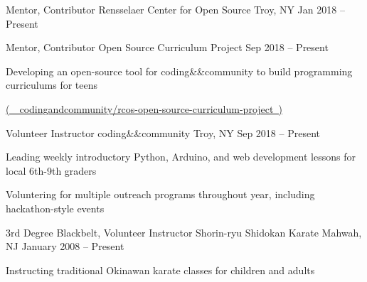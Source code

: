 


\begin{cventries}

  \cventry
  {Mentor, Contributor}
  {Rensselaer Center for Open Source}
  {Troy, NY}
  {Jan 2018 -- Present}
  {
    \vspace*{-1\abovedisplayskip}
    \begin{cvsubentries}
      \cvsubentry
      {Mentor, Contributor}
      {Open Source Curriculum Project}
      {Sep 2018 -- Present}
      {
        \begin{cvitems}
          \item Developing an open-source tool for coding\&\&community to build programming curriculums for teens
          \item[] \href{https://github.com/codingandcommunity/rcos-open-source-curriculum-project}{(\ \faGithubSquare\ codingandcommunity/rcos-open-source-curriculum-project\ )}
        \end{cvitems}
      }
    \end{cvsubentries}
    \vspace*{-1\belowdisplayskip}
  }


  \cventry
  {Volunteer Instructor}
  {coding\&\&community}
  {Troy, NY}
  {Sep 2018 -- Present}
  {
    \begin{cvitems}
      \item Leading weekly introductory Python, Arduino, and web development lessons for local 6th-9th graders
      \item Voluntering for multiple outreach programs throughout year, including hackathon-style events
    \end{cvitems}
  }


  \cventry
  {3rd Degree Blackbelt, Volunteer Instructor}
  {Shorin-ryu Shidokan Karate}
  {Mahwah, NJ}
  {January 2008 -- Present}
  {
    \begin{cvitems}
      \item Instructing traditional Okinawan karate classes for children and adults
    \end{cvitems}
  }


\end{cventries}
